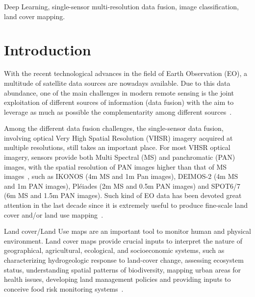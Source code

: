 \documentclass[journal]{IEEEtran}
\begin{document}
\begin{IEEEkeywords}
Deep Learning, single-sensor multi-resolution data fusion, image classification, land cover mapping.
\end{IEEEkeywords}



\section{Introduction}
\label{sec:intro}
With the recent technological advances in the field of Earth Observation (EO), a multitude of satellite data sources are nowadays available. Due to this data abundance, one of the main challenges in modern remote sensing is the joint exploitation of different sources of information (data fusion) with the aim to leverage as much as possible the complementarity among different sources~\cite{Schmitt17}.

Among the different data fusion challenges, the single-sensor data fusion, involving optical Very High Spatial Resolution (VHSR) imagery acquired at multiple resolutions, still takes an important place. For most VHSR optical imagery, sensors provide both Multi Spectral (MS) and panchromatic (PAN) images, with the spatial resolution of PAN images higher than that of MS images~\cite{LiuJZZZLYT18}, such as IKONOS (4m MS and 1m Pan images), DEIMOS-2 (4m MS and 1m PAN images), Pl\'{e}iades (2m MS and 0.5m PAN images) and SPOT6/7 (6m MS and 1.5m PAN images). Such kind of EO data has been devoted great attention in the last decade since it is extremely useful to produce fine-scale land cover and/or land use mapping~\cite{GeorganosGVLSW18}.

Land cover/Land Use maps are an important tool to monitor human and physical environment. Land cover maps provide crucial inputs to interpret the nature of geographical, agricultural, ecological, and socioeconomic systems, such as characterizing hydrogeologic response to land-cover change, assessing ecosystem status, understanding spatial patterns of biodiversity, mapping urban areas for health issues, developing land management policies and providing inputs to conceive food risk monitoring systems~\cite{BegueABBAFLLSV18}.
\end{document}
